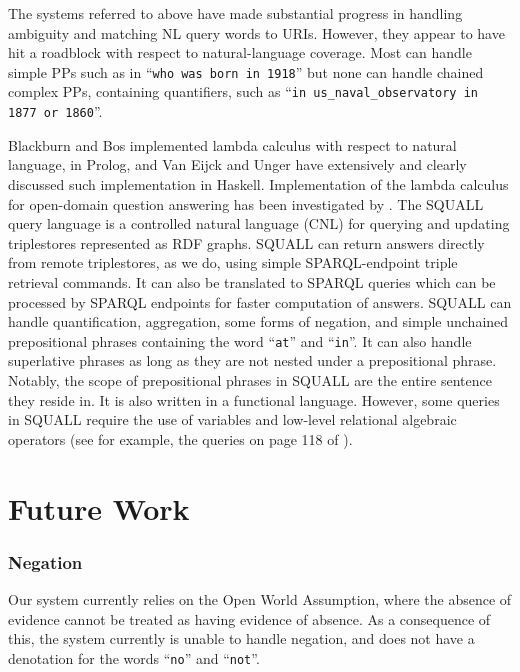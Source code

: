 \documentclass[../main.tex]{subfiles}
\begin{document}
\begin{refsection}
The systems referred to above have made substantial progress in handling ambiguity and matching NL query words to URIs. However, they appear to have hit a roadblock with respect to natural-language coverage. Most can handle simple PPs such as in ``\texttt{who was born in 1918}'' but none can handle chained complex PPs, containing quantifiers, such as ``\texttt{in us\_naval\_observatory in 1877 or 1860}''.

Blackburn and Bos \cite{blackburn2005representation} implemented lambda calculus with respect to natural language, in
Prolog, and Van Eijck and Unger \cite{van2010computational} have extensively and clearly discussed such implementation in
Haskell. Implementation of the lambda calculus for open-domain question answering has been
investigated by \cite{ahn2005question}.
The SQUALL query language \cite{ferre:squall,ferre2013squall} is a controlled natural language
(CNL) for querying and updating triplestores represented as RDF graphs. SQUALL can return
answers directly from remote triplestores, as we do, using simple SPARQL-endpoint triple
retrieval commands. It can also be translated to SPARQL queries which can be processed by
SPARQL endpoints for faster computation of answers. SQUALL can handle
quantification, aggregation, some forms of negation, and simple unchained prepositional phrases containing the word ``\texttt{at}'' and ``\texttt{in}''.  It can also handle superlative phrases as long as they are not nested under a prepositional phrase.  Notably, the scope of prepositional phrases in SQUALL are the entire sentence they reside in.
It is also written in a functional language. However, some queries in SQUALL require the use of variables and low-level relational algebraic operators (see for example, the queries on page 118
of \cite{ferre2013squall}).


\section{Future Work}
\label{webist2019journal:futurework}

\subsubsection{Negation}
Our system currently relies on the Open World Assumption, where the absence of evidence cannot be treated as having evidence of absence.  As a consequence of this, the system currently is unable to handle negation, and does not have a denotation for the words ``\texttt{no}'' and ``\texttt{not}''.


\end{refsection}
\end{document}
